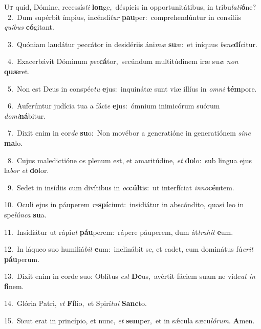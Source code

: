 \lettrine{\initial\textcolor{\initialcolor}{U}}{t} quid, Dómine, recessís\textit{ti} \textbf{lon}\-ge,~\star déspicis in opportunitátibus, in tribu\-\textit{la}\-\textit{ti}\textbf{ó}ne?\\
{\numbfont\textcolor{\numbcolor}{~2.}}~Dum supérbit ímpius, incéndi\textit{tur} \textbf{pau}\-per:~\star comprehendúntur in consíliis \textit{qui}\-\textit{bus} \textbf{có}\-gitant.\par
{\numbfont\textcolor{\numbcolor}{~3.}}~Quóniam laudátur peccátor in desidériis áni\textit{mæ} \textbf{su}\-æ:~\star et iníquus \textit{be}\-\textit{ne}\textbf{dí}citur.\par
{\numbfont\textcolor{\numbcolor}{~4.}}~Exacerbávit Dóminum \textit{pec}\-\textbf{cá}tor,~\star secúndum multitúdinem iræ su\textit{æ} \textit{non} \textbf{quæ}\-ret.\par
{\numbfont\textcolor{\numbcolor}{~5.}}~Non est Deus in conspéc\textit{tu} \textbf{e}\-jus:~\star inquinátæ sunt viæ illíus in \textit{om}\-\textit{ni} \textbf{tém}\-pore.\par
{\numbfont\textcolor{\numbcolor}{~6.}}~Auferúntur judícia tua a fáci\textit{e} \textbf{e}\-jus:~\star ómnium inimicórum suórum \textit{do}\-\textit{mi}\textbf{ná}bitur.\par
{\numbfont\textcolor{\numbcolor}{~7.}}~Dixit enim in cor\textit{de} \textbf{su}\-o:~\star Non movébor a generatióne in generatiónem \textit{si}\-\textit{ne} \textbf{ma}\-lo.\par
{\numbfont\textcolor{\numbcolor}{~8.}}~Cujus maledictióne os plenum est, et amaritúdine, \textit{et} \textbf{do}\-lo:~\star sub lingua ejus la\textit{bor} \textit{et} \textbf{do}\-lor.\par
{\numbfont\textcolor{\numbcolor}{~9.}}~Sedet in insídiis cum divítibus in \textit{oc}\-\textbf{cúl}tis:~\star ut interfíciat \textit{in}\-\textit{no}\textbf{cén}tem.\par
{\numbfont\textcolor{\numbcolor}{10.}}~Oculi ejus in páuperem \textit{re}\-\textbf{spí}ciunt:~\star insidiátur in abscóndito, quasi leo in spe\-\textit{lún}\-\textit{ca} \textbf{su}\-a.\par
{\numbfont\textcolor{\numbcolor}{11.}}~Insidiátur ut rápi\textit{at} \textbf{páu}\-perem:~\star rápere páuperem, dum át\-\textit{tra}\-\textit{hit} \textbf{e}\-um.\par
{\numbfont\textcolor{\numbcolor}{12.}}~In láqueo suo humiliá\textit{bit} \textbf{e}\-um:~\star inclinábit se, et cadet, cum dominátus fú\-\textit{e}\-\textit{rit} \textbf{páu}\-perum.\par
{\numbfont\textcolor{\numbcolor}{13.}}~Dixit enim in corde suo: Oblítus \textit{est} \textbf{De}\-us,~\star avértit fáciem suam ne víde\textit{at} \textit{in} \textbf{fi}\-nem.\par
{\numbfont\textcolor{\numbcolor}{14.}}~Glória Patri, \textit{et} \textbf{Fí}\-lio,~\star et Spirí\-\textit{tu}\-\textit{i} \textbf{Sanc}\-to.\par
{\numbfont\textcolor{\numbcolor}{15.}}~Sicut erat in princípio, et nunc, \textit{et} \textbf{sem}\-per,~\star et in sǽcula sæcu\-\textit{ló}\-\textit{rum}. \textbf{A}\-men.\par
